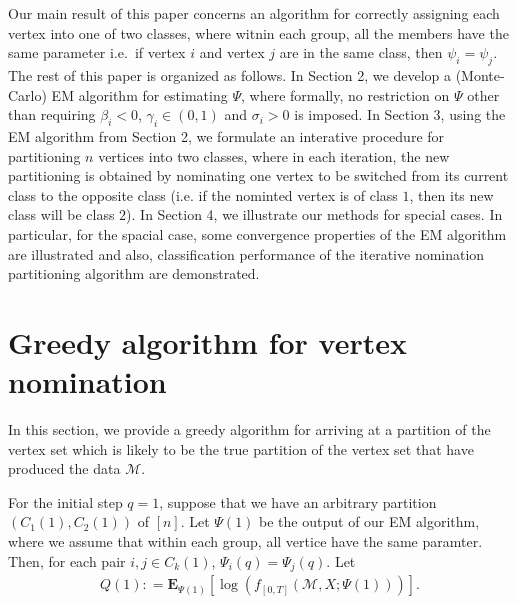 \documentclass[12pt]{article}%
\begin{document}
Our main result of this paper concerns an algorithm for correctly assigning each vertex into one of two classes, where witnin each group, all the members  
have the same parameter i.e.\ if vertex $i$ and vertex $j$ are in the same
class, then $\psi_i = \psi_j$.  The rest of this paper is organized as follows.
In Section 2, we develop a (Monte-Carlo) EM algorithm for estimating 
$\Psi$, where formally, no restriction on $\Psi$
other than requiring $\beta_i < 0$, $\gamma_i \in (0,1)$ and $\sigma_i > 0$ is imposed. 
In Section 3, using the EM algorithm from Section 2, we formulate an interative 
procedure for partitioning $n$ vertices into two classes, where in each iteration, the new partitioning is obtained by nominating one vertex to be switched from its current class to the opposite class (i.e. if the nominted vertex is of class $1$, then its new class will be class $2$).  In Section 4, we illustrate our methods for special cases.  In particular, for the spacial case, some convergence properties of the EM algorithm are illustrated and also, classification performance of the iterative nomination partitioning algorithm are demonstrated.  

\section{Greedy algorithm for vertex nomination}
In this section, we provide a greedy algorithm for arriving at a partition 
of the vertex set which is likely to be the true partition of 
the vertex set that  have produced the data $\mathcal M$.

For the initial step $q=1$, suppose that we have 
an arbitrary partition $(C_1(1), C_2(1))$ of $[n]$. 
Let $\Psi(1)$ be the output of our EM algorithm, where we assume that within each group,
all vertice have the same paramter.  Then, for each pair $i, j \in C_k(1)$, $\Psi_i(q) = \Psi_j(q)$.  
Let
\begin{eqnarray}
Q(1) : = \mathbf E_{\Psi(1)}\left[\log(f_{[0,T]}(\mathcal M, X;\Psi(1)))\right].
\end{eqnarray}
\end{document}
